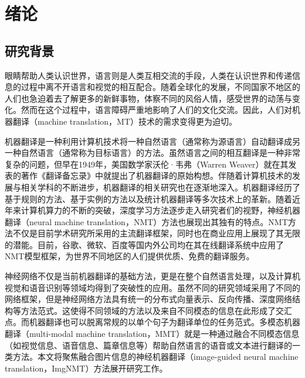 \chapter{绪论}

\section{研究背景}
眼睛帮助人类认识世界，语言则是人类互相交流的手段，人类在认识世界和传递信息的过程中离不开语言和视觉的相互配合。随着全球化的发展，不同国家不地区的人们也急迫着去了解更多的新鲜事物，体察不同的风俗人情，感受世界的动荡与变化。然而在这个过程中，语言障碍严重地影响了人们的文化交流。因此，人们对机器翻译（machine translation，MT）技术的需求变得更为迫切。

机器翻译是一种利用计算机技术将一种自然语言（通常称为源语言）自动翻译成另一种自然语言（通常称为目标语言）的方法\cite{zong2013}。虽然语言之间的相互翻译是一种非常复杂的问题，但早在1949年，美国数学家沃伦·韦弗（Warren Weaver）就在其发表的著作《翻译备忘录》中就提出了机器翻译的原始构想。伴随着计算机技术的发展与相关学科的不断进步，机器翻译的相关研究也在逐渐地深入。机器翻译经历了基于规则的方法、基于实例的方法以及统计机器翻译等多次技术上的革新。随着近年来计算机算力的不断的突破，深度学习方法逐步走入研究者们的视野，神经机器翻译（neural machine translation，NMT）\cite{kalchbrenner-blunsom-2013-recurrent,1_DBLP:journals/corr/SutskeverVL14,3_DBLP:journals/corr/BahdanauCB14}方法也展现出其独有的特点。NMT方法不仅是目前学术研究所采用的主流翻译框架，同时也在商业应用上展现了其无限的潜能。目前，谷歌、微软、百度等国内外公司均在其在线翻译系统中应用了NMT模型框架，为世界不同地区的人们提供优质、免费的翻译服务。

神经网络不仅是当前机器翻译的基础方法，更是在整个自然语言处理，以及计算机视觉和语音识别等领域均得到了突破性的应用。虽然不同的研究领域采用了不同的网络框架，但是神经网络方法具有统一的分布式向量表示、反向传播、深度网络结构等方法范式。这使得不同领域的方法以及来自不同模态的信息在此形成了交汇点。而机器翻译也可以脱离常规的以单个句子为翻译单位的任务范式。多模态机器翻译（multi-modal machine translation，MMT）就是一种通过融合不同模态信息（如视觉信息、语音信息、篇章信息等）帮助自然语言的语音或文本进行翻译的一类方法。本文将聚焦融合图片信息的神经机器翻译（image-guided neural machine translation，ImgNMT）方法展开研究工作。


